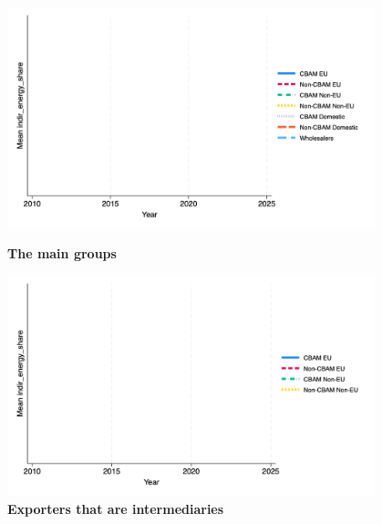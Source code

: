 \documentclass{article}
\begin{document}
\begin{figure}[H]
\centering
\includegraphics[width=0.95\textwidth]{indir_energy_share_main_groups.png}
\caption{\textbf{The main groups}}
\includegraphics[width=0.95\textwidth]{indir_energy_share_ei.png}
\caption{\textbf{Exporters that are intermediaries}}
\end{figure}
\end{document}
